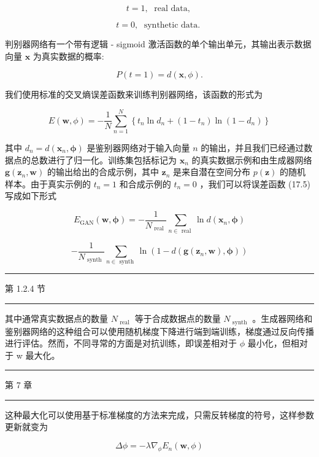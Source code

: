 \documentclass[10pt]{article}
\newcommand{\HRule}{\begin{center}\rule{0.9\linewidth}{0.2mm}\end{center}}
\begin{document}
\[
t = 1,\;\text{ real data, } \tag{17.2}
\]

\[
t = 0,\;\text{ synthetic data. } \tag{17.3}
\]

判别器网络有一个带有逻辑 -  sigmoid 激活函数的单个输出单元，其输出表示数据向量 \(\mathbf{x}\) 为真实数据的概率:

\[
P\left( {t = 1}\right)  = d\left( {\mathbf{x},\phi }\right) . \tag{17.4}
\]

我们使用标准的交叉熵误差函数来训练判别器网络，该函数的形式为

\[
E\left( {\mathbf{w},\phi }\right)  =  - \frac{1}{N}\mathop{\sum }\limits_{{n = 1}}^{N}\left\{  {{t}_{n}\ln {d}_{n} + \left( {1 - {t}_{n}}\right) \ln \left( {1 - {d}_{n}}\right) }\right\}   \tag{17.5}
\]

其中 \({d}_{n} = d\left( {{\mathbf{x}}_{n},\mathbf{\phi }}\right)\) 是鉴别器网络对于输入向量 \(n\) 的输出，并且我们已经通过数据点的总数进行了归一化。训练集包括标记为 \({\mathbf{x}}_{n}\) 的真实数据示例和由生成器网络 \(\mathbf{g}\left( {{\mathbf{z}}_{n},\mathbf{w}}\right)\) 的输出给出的合成示例，其中 \({\mathbf{z}}_{n}\) 是来自潜在空间分布 \(p\left( \mathbf{z}\right)\) 的随机样本。由于真实示例的 \({t}_{n} = 1\) 和合成示例的 \({t}_{n} = 0\) ，我们可以将误差函数 (17.5) 写成如下形式

\[
{E}_{\mathrm{{GAN}}}\left( {\mathbf{w},\mathbf{\phi }}\right)  =  - \frac{1}{{N}_{\text{ real }}}\mathop{\sum }\limits_{{n \in  \text{ real }}}\ln d\left( {{\mathbf{x}}_{n},\mathbf{\phi }}\right)
\]

\[
- \frac{1}{{N}_{\text{ synth }}}\mathop{\sum }\limits_{{n \in  \text{ synth }}}\ln \left( {1 - d\left( {\mathbf{g}\left( {{\mathbf{z}}_{n},\mathbf{w}}\right) ,\mathbf{\phi }}\right) }\right)  \tag{17.6}
\]

\HRule

第 1.2.4 节

\HRule

其中通常真实数据点的数量 \({N}_{\text{ real }}\) 等于合成数据点的数量 \({N}_{\text{ synth }}\) 。生成器网络和鉴别器网络的这种组合可以使用随机梯度下降进行端到端训练，梯度通过反向传播进行评估。然而，不同寻常的方面是对抗训练，即误差相对于 \(\phi\) 最小化，但相对于 w 最大化。

\HRule

第 7 章

\HRule

这种最大化可以使用基于标准梯度的方法来完成，只需反转梯度的符号，这样参数更新就变为

\[
{\Delta \phi } =  - \lambda {\nabla }_{\phi }{E}_{n}\left( {\mathbf{w},\phi }\right)  \tag{17.7}
\]
\end{document}
